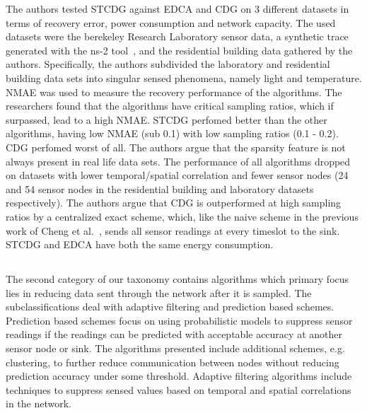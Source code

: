 The authors tested \ac{STCDG} against \ac{EDCA} and \ac{CDG} on 3 different
datasets in terms of recovery error, power consumption and network capacity.
The used datasets were the berekeley Research Laboratory sensor data, a
synthetic trace generated with the ns-2 tool~\cite{bajaj1999improving}, and the
residential building data gathered by the authors. Specifically, the authors
subdivided the laboratory and residential building data sets into singular
sensed phenomena, namely light and temperature. \ac{NMAE} was used to measure
the recovery performance of the algorithms. The researchers found that the
algorithms have critical sampling ratios, which if surpassed, lead to a high
\ac{NMAE}. \ac{STCDG} perfomed better than the other algorithms, having low
\ac{NMAE} (sub 0.1) with low sampling ratios (0.1 - 0.2). \ac{CDG} perfomed
worst of all. The authors argue that the sparsity feature is not always present
in real life data sets. The performance of all algorithms dropped on datasets
with lower temporal/spatial correlation and fewer sensor nodes (24 and 54
sensor nodes in the residential building and laboratory datasets respectively).
The authors argue that \ac{CDG} is outperformed at high sampling ratios by a
centralized exact scheme, which, like the naive scheme in the previous work of
Cheng et al.~\cite{cheng2013stcdg}, sends all sensor readings at every timeslot
to the sink. \ac{STCDG} and \ac{EDCA} have both the same energy consumption.


\subsection{\catII} %
\label{sec:catII}

The second category of our taxonomy contains algorithms which primary focus
lies in reducing data sent through the network after it is sampled. The
subclassifications deal with adaptive filtering and prediction based schemes.
Prediction based schemes focus on using probabilistic models to suppress sensor
readings if the readings can be predicted with acceptable accuracy at another
sensor node or sink. The algorithms presented include additional schemes, e.g.
clustering, to further reduce communication between nodes without reducing
prediction accuracy under some threshold. Adaptive filtering algorithms include
techniques to suppress sensed values based on temporal and spatial correlations
in the network.


